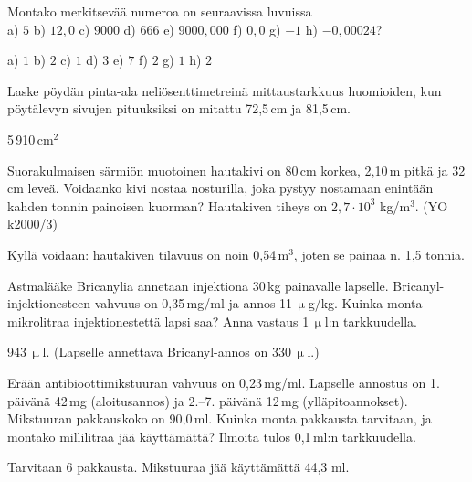 \begin{tehtavasivu}
\begin{tehtava}
Montako merkitsevää numeroa on seuraavissa luvuissa \\
a) $5$ \qquad
b) $12,0$ \qquad
c) $9000$ \qquad
d) $666$ \qquad
e) $9000,000$ \qquad
f) $0,0$ \qquad
g) $-1$ \qquad
h) $-0,00024$?
\begin{vastaus}
a) $1$ \qquad
b) $2$ \qquad
c) $1$ \qquad
d) $3$ \qquad
e) $7$ \qquad
f) $2$ \qquad
g) $1$ \qquad
h) $2$
\end{vastaus}
\end{tehtava}


\begin{tehtava}
Laske pöydän pinta-ala neliösenttimetreinä mittaustarkkuus huomioiden,
kun pöytälevyn sivujen pituuksiksi on mitattu 72,5\,cm ja 81,5\,cm.
\begin{vastaus}
5\,910\,cm$^2$
\end{vastaus}
\end{tehtava}

\begin{tehtava}
Suorakulmaisen särmiön muotoinen hautakivi on 80\,cm korkea, 2,10\,m pitkä ja 32\,cm leveä.
Voidaanko kivi nostaa nosturilla, joka pystyy nostamaan enintään kahden tonnin painoisen kuorman? Hautakiven tiheys on $2,7 \cdot 10^3$ kg/m$^3$. (YO k2000/3)
\begin{vastaus}
Kyllä voidaan: hautakiven tilavuus on noin 0,54\,m$^3$, joten se painaa n. 1,5 tonnia.
\end{vastaus}
\end{tehtava}

\begin{tehtava}
Astmalääke Bricanylia annetaan injektiona 30\,kg painavalle lapselle. Bricanyl-injektionesteen vahvuus on 0,35\,mg/ml ja annos 11\,$\upmu$g/kg. Kuinka monta mikrolitraa injektionestettä lapsi saa? Anna vastaus 1\,$\upmu$l:n tarkkuudella.
 \begin{vastaus}
  943\,$\upmu$l. (Lapselle annettava Bricanyl-annos on 330\,$\upmu$l.)
 \end{vastaus}
\end{tehtava}

\begin{tehtava}
Erään antibioottimikstuuran vahvuus on 0,23\,mg/ml. Lapselle annostus on 1. päivänä 42\,mg (aloitusannos) 
ja 2.--7. päivänä 12\,mg (ylläpitoannokset). Mikstuuran pakkauskoko on 90,0\,ml. Kuinka monta pakkausta tarvitaan, ja montako millilitraa jää käyttämättä? Ilmoita tulos 0,1\,ml:n tarkkuudella.
 \begin{vastaus}
Tarvitaan 6 pakkausta. Mikstuuraa jää käyttämättä 44,3 ml.
 \end{vastaus}
\end{tehtava}


\end{tehtavasivu}
